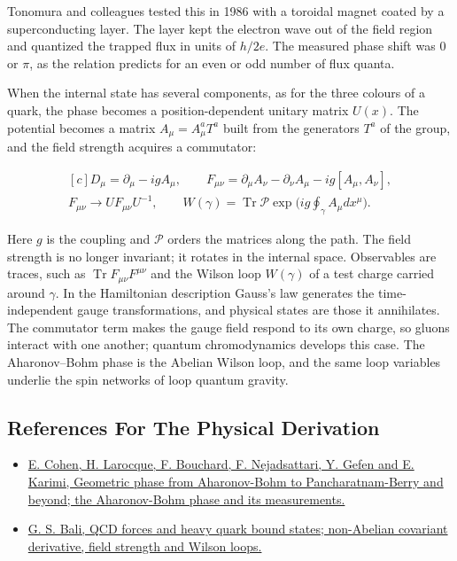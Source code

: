\documentclass[11pt,oneside]{book}
\newenvironment{centeredalign}{\[\begin{gathered}[c]}{\end{gathered}\]}
\begin{document}
Tonomura and colleagues tested this in 1986 with a toroidal magnet coated by a superconducting layer. The layer kept the electron wave out of the field region and quantized the trapped flux in units of \(h/2e\). The measured phase shift was \(0\) or \(\pi\), as the relation predicts for an even or odd number of flux quanta.

When the internal state has several components, as for the three colours of a quark, the phase becomes a position-dependent unitary matrix \(U(x)\). The potential becomes a matrix \(A_\mu=A_\mu^aT^a\) built from the generators \(T^a\) of the group, and the field strength acquires a commutator:

\begin{centeredalign}
D_\mu=\partial_\mu-igA_\mu,\qquad
F_{\mu\nu}=\partial_\mu A_\nu-\partial_\nu A_\mu-ig[A_\mu,A_\nu],\\
F_{\mu\nu}\to UF_{\mu\nu}U^{-1},\qquad
W(\gamma)=\operatorname{Tr}\mathcal P\exp\Big(ig\oint_\gamma A_\mu dx^\mu\Big).
\end{centeredalign}

Here \(g\) is the coupling and \(\mathcal P\) orders the matrices along the path. The field strength is no longer invariant; it rotates in the internal space. Observables are traces, such as \(\operatorname{Tr}F_{\mu\nu}F^{\mu\nu}\) and the Wilson loop \(W(\gamma)\) of a test charge carried around \(\gamma\). In the Hamiltonian description Gauss's law generates the time-independent gauge transformations, and physical states are those it annihilates. The commutator term makes the gauge field respond to its own charge, so gluons interact with one another; quantum chromodynamics develops this case. The Aharonov--Bohm phase is the Abelian Wilson loop, and the same loop variables underlie the spin networks of loop quantum gravity.

\subsection*{References For The Physical Derivation}
\begin{itemize}
\item \href{https://arxiv.org/abs/1912.12596}{E. Cohen, H. Larocque, F. Bouchard, F. Nejadsattari, Y. Gefen and E. Karimi, Geometric phase from Aharonov-Bohm to Pancharatnam-Berry and beyond; the Aharonov-Bohm phase and its measurements.}
\item \href{https://arxiv.org/abs/hep-ph/0001312}{G. S. Bali, QCD forces and heavy quark bound states; non-Abelian covariant derivative, field strength and Wilson loops.}
\end{itemize}
\end{document}
